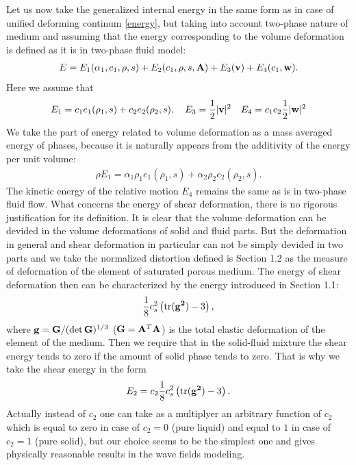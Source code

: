 \documentclass[3p,times]{elsarticle}
\newcommand{\tr}{\textnormal{tr}}
\begin{document}
Let us now take the generalized internal energy in the same form as in case of unified deforming continum \eqref{energy}, but taking into account two-phase nature of medium and assuming that the energy corresponding to the volume deformation is defined as it is in two-phase fluid model: 
\begin{align}
E=E_1(\alpha_1, c_1, \rho, s)+E_2(c_1,\rho,s,{\bf A})+E_3({\bf v})+E_4(c_1,{\bf w}). \label{energy.SF}
\end{align}
Here we assume that 
\begin{align} \label{energy12.SF}
E_1=c_1e_1(\rho_1,s)+c_2e_2(\rho_2,s), \quad
E_3=\frac{1}{2}|{\bf v}|^2 \quad E_4=c_1c_2\frac{1}{2}|{\bf w}|^2
\end{align}
We take the part of energy related to volume deformation as a mass averaged energy of phases, because it is naturally appears from the additivity of the energy per unit volume:
\begin{align} \label{energy.mix}
\rho E_1=\alpha_1 \rho_1e_1(\rho_1,s)+\alpha_2 \rho_2 e_2(\rho_2,s). 
\end{align}
The kinetic energy of the relative motion $E_4$ remains the same as is in two-phase fluid flow.
What concerns the energy of shear deformation, there is no rigorous justification for its definition. It is clear that the volume deformation can be devided in the volume deformations of solid and fluid parts.
But the deformation in general and shear deformation in particular can not be simply devided in two parts and we take the normalized distortion defined is Section 1.2 as the measure of deformation of the element of saturated porous medium. The energy of shear deformation then can be characterized by the energy introduced in Section 1.1:
\begin{align}
\frac{1}{8}c_s^2\left(\tr({{\bf g^2}})-3\right),
\end{align}
where  ${\bf g}={\bf G}/(\det{\bf G})^{1/3}$ (${\bf G}={\bf A}^T{\bf A}$) is the total elastic deformation of the element of the medium. 
Then we require that in the solid-fluid mixture the shear energy tends to zero if the amount of solid phase tends to zero. That is why we take the shear energy in the form
\begin{align} \label{energy,shear}
E_2=c_2 \frac{1}{8}c_s^2\left(\tr({{\bf g^2}})-3\right).
\end{align}
Actually instead of $c_2$ one can take as a multiplyer an arbitrary function of $c_2$ which is equal to zero in case of $c_2=0$ (pure liquid) and equal to $1$ in case of $c_2=1$ (pure solid),
but our choice seems to be the simplest one and gives physically reasonable results in the wave fields modeling.
\end{document}

